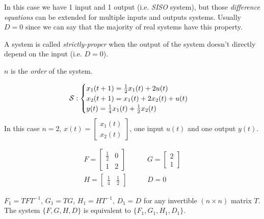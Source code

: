 In this case we have 1 input and 1 output (i.e. \emph{SISO} system), but those \emph{difference equations} can be extended for multiple inputs and outputs systems. Usually $D=0$ since we can say that the majority of real systems have this property. 

\begin{definition} 
A system is called \emph{strictly-proper} when the output of the system doesn't directly depend on the input (i.e. $D=0$). 
\end{definition}

\begin{obs}
$n$ is the \emph{order} of the system.
\end{obs}

\begin{example}[SISO system of order $n=2$]
    \[
    \mathcal{S}: 
        \begin{cases}
            x_1(t+1) = \frac{1}{2} x_1(t) + 2u(t) \\
            x_2(t+1) = x_1(t) + 2x_2(t) + u(t) \\
            y(t) = \frac{1}{4}x_1(t) + \frac{1}{2}x_2(t)
        \end{cases}
    \]
    In this case $n=2$, $x(t) = \begin{bmatrix}
        x_1(t) \\
        x_2(t)
    \end{bmatrix}$, one input $u(t)$ and one output $y(t)$.

    \begin{align*}
        F = \begin{bmatrix}
            \frac{1}{2} & 0 \\
            1 & 2
        \end{bmatrix}
        & \qquad
        G = \begin{bmatrix}
            2 \\ 1
        \end{bmatrix}
        \\
        H = \begin{bmatrix}
            \frac{1}{4} & \frac{1}{2}
        \end{bmatrix}
        & \qquad
        D = 0
    \end{align*}
\end{example}


\begin{remark}
    $F_1 = TFT^{-1}$, $G_1 = TG$, $H_1 = HT^{-1}$, $D_1 = D$ for any invertible $(n\times n)$ matrix $T$. The system $\{F, G, H, D\}$ is equivalent to $\{F_1, G_1, H_1, D_1\}$.
\end{remark}